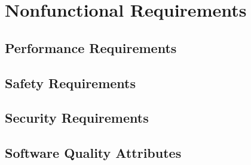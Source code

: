 {
\chapter{Nonfunctional Requirements}
\section{Performance Requirements}
\section{Safety Requirements}
\section{Security Requirements}
\section{Software Quality Attributes}
}